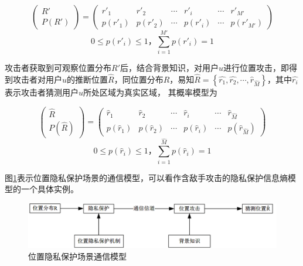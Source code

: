 \begin{equation}
\begin{pmatrix}
R{}'\\ 
P({R}')
\end{pmatrix}=\begin{pmatrix}
{r}'_{1} & {r}'_{2} & \cdots  & {r}'_{i} & \cdots  & {r}'_{{M}'}\\ 
p({r}'_{1})& p({r}'_{2}) & \cdots & p({r}'_{i}) & \cdots & p({r}'_{{M}'})
\end{pmatrix}
\end{equation}
\begin{equation}
0\leq p({r}'_{i})\leq1，\sum_{i=1}^{M{}'}p({r}'_{i})=1
\end{equation}

攻击者获取到可观察位置分布$R{}'$后，结合背景知识，对用户$u$进行位置攻击，即得到攻击者对用户$u$的推断位置$\hat{R}$，同位置分布$R$，易知$\hat{R}=\left \{ \hat{r_{1}},\hat{r_{2}},\cdots ,\hat{r}_{\hat{M}} \right \}$，其中$\hat{r_{i}}$表示攻击者猜测用户$u$所处区域为真实区域， 其概率模型为

\begin{equation}
\begin{pmatrix}
\hat{R}\\ 
P(\hat{R})
\end{pmatrix}=\begin{pmatrix}
\hat{r}_{1} & \hat{r}_{2} & \cdots  & \hat{r}_{i} & \cdots  & \hat{r}_{\hat{M}}\\ 
p(\hat{r}_{1})& p(\hat{r}_{2}) & \cdots & p(\hat{r}_{i}) & \cdots & p(\hat{r}_{\hat{M}})
\end{pmatrix}
\end{equation}
\begin{equation}
0\leq p(\hat{r}_{i})\leq 1，\sum_{i=1}^{\hat{M}}p(\hat{r}_{i})=1
\end{equation}

图\ref{fig:Communication-Model-for-Privacy-of-location}表示位置隐私保护场景的通信模型，可以看作含敌手攻击的隐私保护信息熵模型的一个具体实例。

\begin{figure}[htbp]
	\centering
	\includegraphics[width = 0.95\linewidth]{./figures/Communication-Model-for-Privacy-of-location.png}
	\caption{位置隐私保护场景通信模型}
	\label{fig:Communication-Model-for-Privacy-of-location}
\end{figure}

